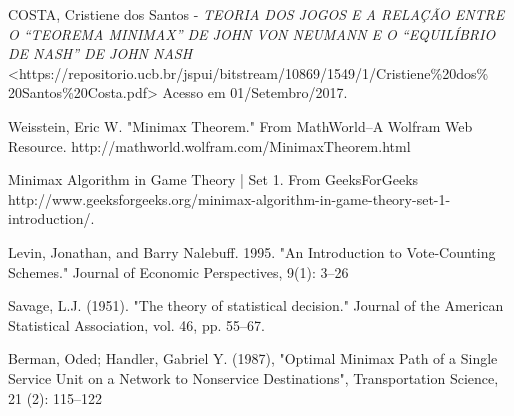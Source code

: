 \documentclass[]{article}
\begin{document}
\begin{thebibliography}{1}
	 COSTA, Cristiene dos Santos - \textit{TEORIA DOS JOGOS E A RELAÇÃO ENTRE O “TEOREMA MINIMAX” DE JOHN VON NEUMANN E O “EQUILÍBRIO DE NASH” DE JOHN NASH} <https://repositorio.ucb.br/jspui/bitstream/10869/1549/1/Cristiene\%20dos\%
	20Santos\%20Costa.pdf> Acesso em 01/Setembro/2017.
	
	 Weisstein, Eric W. "Minimax Theorem." From MathWorld--A Wolfram Web Resource. http://mathworld.wolfram.com/MinimaxTheorem.html
	
	 Minimax Algorithm in Game Theory | Set 1. From GeeksForGeeks  http://www.geeksforgeeks.org/minimax-algorithm-in-game-theory-set-1-introduction/.
	
	 Levin, Jonathan, and Barry Nalebuff. 1995. "An Introduction to Vote-Counting Schemes." Journal of Economic Perspectives, 9(1): 3–26
	
	 Savage, L.J. (1951). "The theory of statistical decision." Journal of the American Statistical Association, vol. 46, pp. 55–67.
	
	 Berman, Oded; Handler, Gabriel Y. (1987), "Optimal Minimax Path of a Single Service Unit on a Network to Nonservice Destinations", Transportation Science, 21 (2): 115–122
	
	
	
\end{thebibliography}	 
	
\end{document}
